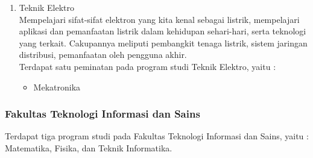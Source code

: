 \begin{enumerate}
		\item Teknik Elektro\\
			Mempelajari sifat-sifat elektron yang kita kenal sebagai listrik, mempelajari aplikasi dan pemanfaatan listrik dalam kehidupan sehari-hari, serta teknologi yang terkait. Cakupannya meliputi pembangkit tenaga listrik, sistem jaringan distribusi, pemanfaatan oleh pengguna akhir.\\
			
			Terdapat satu peminatan pada program studi Teknik Elektro, yaitu :
			
			\begin{itemize}
				\item Mekatronika
			\end{itemize}\leavevmode

	\end{enumerate}
	
\subsubsection{Fakultas Teknologi Informasi dan Sains}
Terdapat tiga program studi pada Fakultas Teknologi Informasi dan Sains, yaitu : Matematika, Fisika, dan Teknik Informatika.
	
